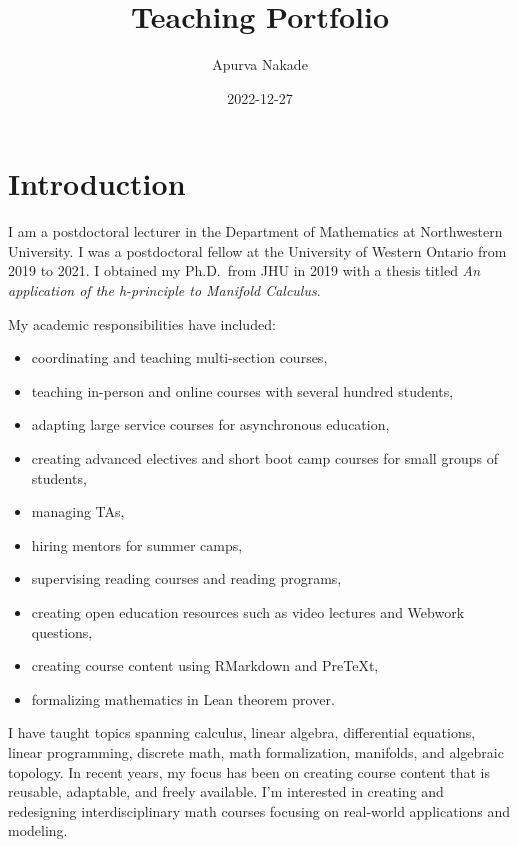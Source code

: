 \documentclass[
]{report}
\title{Teaching Portfolio}
\author{Apurva Nakade}
\date{2022-12-27}
\providecommand{\tightlist}{%
  \setlength{\itemsep}{0pt}\setlength{\parskip}{0pt}}
\begin{document}
\maketitle

\thispagestyle{empty}

{
\setcounter{tocdepth}{2}
\tableofcontents
}
\hypertarget{introduction}{%
\chapter*{Introduction}\label{introduction}}


I am a postdoctoral lecturer in the Department of Mathematics at Northwestern
University. I was a postdoctoral fellow at the University of Western
Ontario from 2019 to 2021. I obtained my Ph.D.~from JHU in 2019 with a thesis titled \emph{An application of
the h-principle to Manifold Calculus}.

My academic responsibilities have included:

\begin{itemize}
\tightlist
\item
  coordinating and teaching multi-section courses,
\item
  teaching in-person and online courses with several hundred students,
\item
  adapting large service courses for asynchronous education,
\item
  creating advanced electives and short boot camp courses for small groups of students,
\item
  managing TAs,
\item
  hiring mentors for summer camps,
\item
  supervising reading courses and reading programs,
\item
  creating open education resources such as video lectures and Webwork questions,
\item
  creating course content using RMarkdown and PreTeXt,
\item
  formalizing mathematics in Lean theorem prover.
\end{itemize}

I have taught topics spanning calculus, linear algebra, differential equations, linear programming, discrete math, math formalization, manifolds, and algebraic topology.
In recent years, my focus has been on creating course content that is reusable, adaptable, and freely available.
I'm interested in creating and redesigning interdisciplinary math courses focusing on real-world applications and modeling.
\end{document}
